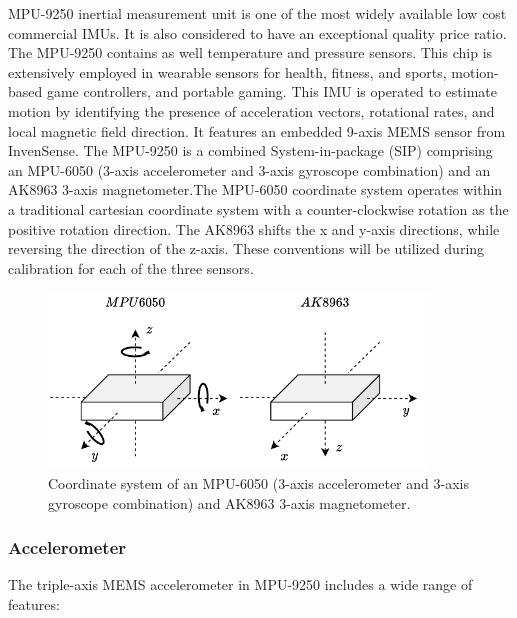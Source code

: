 MPU-9250 inertial measurement unit is one of the most widely available low cost commercial IMUs. It is also considered to have an exceptional quality price ratio. The MPU-9250 contains as well temperature and pressure sensors. This chip is extensively employed in wearable sensors for health, fitness, and sports, motion-based game controllers, and portable gaming. This IMU is operated to estimate motion by identifying the presence of acceleration vectors, rotational rates, and local magnetic field direction. It features an embedded 9-axis MEMS sensor from InvenSense. The MPU-9250 is a combined System-in-package (SIP) comprising an MPU-6050 (3-axis accelerometer and 3-axis gyroscope combination) and an AK8963 3-axis magnetometer.The MPU-6050 coordinate system operates within a traditional cartesian coordinate system with a counter-clockwise rotation as the positive rotation direction. The AK8963 shifts the x and y-axis directions, while reversing the direction of the z-axis. These conventions will be utilized during calibration for each of the three sensors.

\begin{figure}[!h]
    \centering
    \includegraphics[width=0.9\textwidth]{figures/mpu_orientation.pdf}
    \caption{ Coordinate system of an MPU-6050 (3-axis accelerometer and 3-axis gyroscope combination) and AK8963 3-axis magnetometer. }
    \label{fig:mpu_orientation}
\end{figure}

\subsubsection{Accelerometer}

The triple-axis MEMS accelerometer in MPU-9250 includes a wide range of features:

